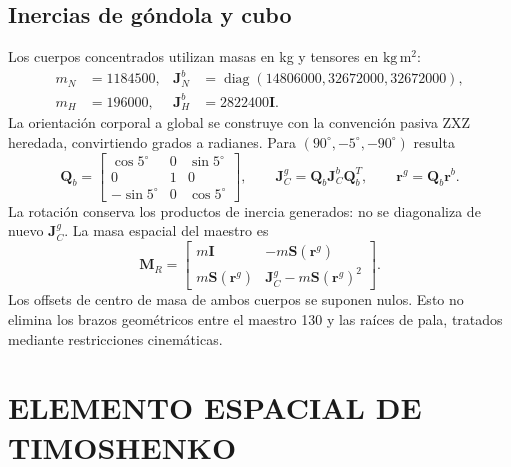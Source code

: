 \documentclass[oneside,a4paper,spanish,links,pagenumbers]{amca}
\newcommand{\I}{\bm I}
\newcommand{\diag}{\operatorname{diag}}
\begin{document}
\subsection{Inercias de góndola y cubo}
Los cuerpos concentrados utilizan masas en kg y tensores en $\mathrm{kg\,m^2}$:
\begin{align}
m_N&=1184500,& \bm J_N^b&=\diag(14806000,32672000,32672000),\\
m_H&=196000,& \bm J_H^b&=2822400\I.
\end{align}
La orientación corporal a global se construye con la convención pasiva ZXZ heredada, convirtiendo grados a radianes. Para $(90^\circ,-5^\circ,-90^\circ)$ resulta
\begin{equation}
\bm Q_b=
\begin{bmatrix}\cos5^\circ&0&\sin5^\circ\\0&1&0\\-\sin5^\circ&0&\cos5^\circ\end{bmatrix},
\qquad \bm J_C^g=\bm Q_b\bm J_C^b\bm Q_b^T,
\qquad \bm r^g=\bm Q_b\bm r^b.
\end{equation}
La rotación conserva los productos de inercia generados: no se diagonaliza de nuevo $\bm J_C^g$. La masa espacial del maestro es
\begin{equation}
\bm M_R=
\begin{bmatrix}
m\I&-m\bm S(\bm r^g)\\
m\bm S(\bm r^g)&\bm J_C^g-m\bm S(\bm r^g)^2
\end{bmatrix}.
\end{equation}
Los offsets de centro de masa de ambos cuerpos se suponen nulos. Esto no elimina los brazos geométricos entre el maestro 130 y las raíces de pala, tratados mediante restricciones cinemáticas.

\section{ELEMENTO ESPACIAL DE TIMOSHENKO}
\end{document}
